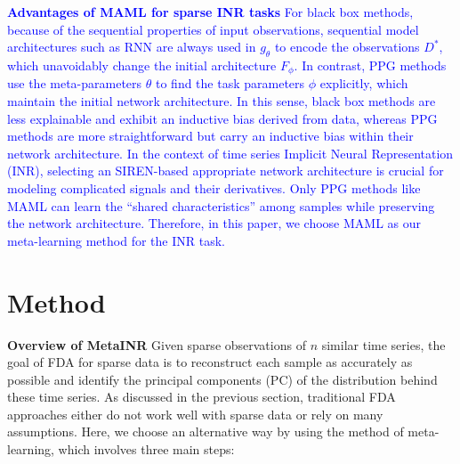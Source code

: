 \documentclass{article}
\begin{document}
\textcolor{blue}{
\textbf{Advantages of MAML for sparse INR tasks}
For black box methods, because of the sequential properties of input observations, sequential model architectures such as RNN are always used in $g_\theta$ to encode the observations $D^*$, which unavoidably change the initial architecture $F_\phi$.
In contrast, PPG methods use the meta-parameters $\theta$ to find the task parameters $\phi$ explicitly, which maintain the initial network architecture.
In this sense, black box methods are less explainable and exhibit an inductive bias derived from data, 
whereas PPG methods are more straightforward but carry an inductive bias within their network architecture.
In the context of time series Implicit Neural Representation (INR), selecting an SIREN-based appropriate network architecture is crucial for modeling complicated signals and their derivatives.
Only PPG methods like MAML can learn the ``shared characteristics'' among samples while preserving the network architecture.
Therefore, in this paper, we choose MAML as our meta-learning method for the INR task.
}




\section{Method}
\textbf{Overview of MetaINR}
Given sparse observations of $n$ similar time series, the goal of FDA for sparse data is to reconstruct each sample as accurately as possible and identify the principal components (PC) of the distribution behind these time series.
As discussed in the previous section, traditional FDA approaches either do not work well with sparse data or rely on many assumptions.
Here, we choose an alternative way by using the method of meta-learning, which involves three main steps:
\end{document}
